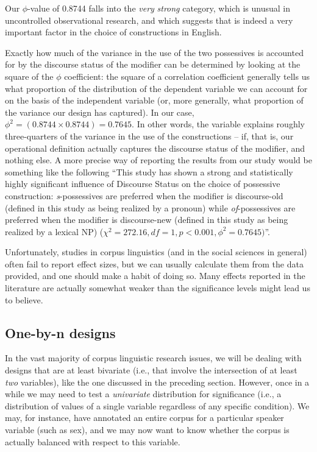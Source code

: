 Our $\phi$-value of 0.8744 falls into the \textit{very} \textit{strong} category, which is unusual in uncontrolled observational research, and which suggests that  is indeed a very important factor in the choice of  constructions in English.

Exactly how much of the variance in the use of the two possessives is accounted for by the discourse status of the modifier can be determined by looking at the square of the $\phi$ coefficient: the square of a correlation coefficient generally tells us what proportion of the distribution of the dependent variable we can account for on the basis of the independent variable (or, more generally, what proportion of the variance our design has captured). In our case, $\phi^2 = (0.8744 \times 0.8744 ) = 0.7645$. In other words, the variable  explains roughly three-quarters of the variance in the use of the  constructions -- if, that is, our operational definition actually captures the discourse status of the modifier, and nothing else. A more precise way of reporting the results from our study would be something like the following ``This study has shown a strong and statistically highly significant influence of Discourse Status on the choice of possessive construction: \textit{s}-possessives are preferred when the modifier is discourse-old (defined in this study as being realized by a pronoun) while \textit{of}-possessives are preferred when the modifier is discourse-new (defined in this study as being realized by a lexical NP) ($\chi^2 = 272.16, df = 1, p < 0.001, \phi^2 = 0.7645)$''.

Unfortunately, studies in corpus linguistics (and in the social sciences in general) often fail to report effect sizes, but we can usually calculate them from the data provided, and one should make a habit of doing so. Many effects reported in the literature are actually somewhat weaker than the significance levels might lead us to believe.

\subsection{One-by-n designs}
\label{sec:chisquareonebyn}

In the vast majority of corpus linguistic research issues, we will be dealing with designs that are at least bivariate (i.e., that involve the intersection of at least \textit{two} variables), like the one discussed in the preceding section. However, once in a while we may need to test a \textit{univariate} distribution for significance (i.e., a distribution of values of a single variable regardless of any specific condition). We may, for instance, have annotated an entire corpus for a particular speaker variable (such as sex), and we may now want to know whether the corpus is actually balanced with respect to this variable.

